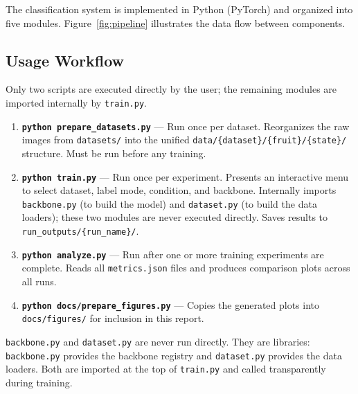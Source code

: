 \documentclass[12pt, a4paper]{article}
\begin{document}
The classification system is implemented in Python (PyTorch) and organized into
five modules.
Figure~\ref{fig:pipeline} illustrates the data flow between components.

\subsection{Usage Workflow}

Only two scripts are executed directly by the user; the remaining modules
are imported internally by \texttt{train.py}.

\begin{enumerate}
    \item \textbf{\texttt{python prepare\_datasets.py}} ---
    Run once per dataset.
    Reorganizes the raw images from \texttt{datasets/} into the unified
    \texttt{data/\{dataset\}/\{fruit\}/\{state\}/} structure.
    Must be run before any training.

    \item \textbf{\texttt{python train.py}} ---
    Run once per experiment.
    Presents an interactive menu to select dataset, label mode, condition,
    and backbone.
    Internally imports \texttt{backbone.py} (to build the model) and
    \texttt{dataset.py} (to build the data loaders); these two modules are
    never executed directly.
    Saves results to \texttt{run\_outputs/\{run\_name\}/}.

    \item \textbf{\texttt{python analyze.py}} ---
    Run after one or more training experiments are complete.
    Reads all \texttt{metrics.json} files and produces comparison plots
    across all runs.

    \item \textbf{\texttt{python docs/prepare\_figures.py}} ---
    Copies the generated plots into \texttt{docs/figures/} for inclusion
    in this report.
\end{enumerate}

\noindent
\texttt{backbone.py} and \texttt{dataset.py} are never run directly.
They are libraries: \texttt{backbone.py} provides the backbone registry and
\texttt{dataset.py} provides the data loaders.
Both are imported at the top of \texttt{train.py} and called transparently
during training.
\end{document}
